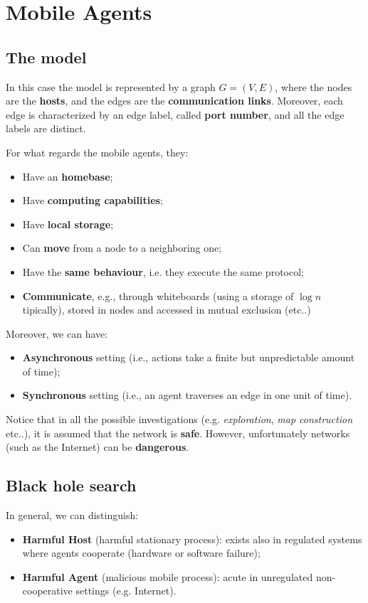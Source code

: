 \section{Mobile Agents}
\subsection{The model}
In this case the model is represented by a graph $G = (V,E)$, where the nodes are the \textbf{hosts}, and the edges are the \textbf{communication links}. Moreover, each edge is characterized by an edge label, called \textbf{port number}, and all the edge labels are distinct.

For what regards the mobile agents, they:
\begin{itemize}
    \item Have an \textbf{homebase};
    \item Have \textbf{computing capabilities};
    \item Have \textbf{local storage};
    \item Can \textbf{move} from a node to a neighboring one;
    \item Have the \textbf{same behaviour}, i.e. they execute the same protocol;
    \item \textbf{Communicate}, e.g., through whiteboards (using a storage of $\log n$ tipically), stored in nodes and accessed in mutual exclusion (etc..)
\end{itemize}


Moreover, we can have:
\begin{itemize}
    \item \textbf{Asynchronous} setting (i.e., actions take a finite but unpredictable amount of time);
    \item \textbf{Synchronous} setting (i.e., an agent traverses an edge in one unit of time).
\end{itemize}

Notice that in all the possible investigations (e.g. \textit{exploration}, \textit{map construction} etc..), it is assumed that the network is \textbf{safe}. However, unfortunately networks (such as the Internet) can be \textbf{dangerous}.

\subsection{Black hole search}
In general, we can distinguish:
\begin{itemize}
    \item \textbf{Harmful Host} (harmful stationary process): exists also in regulated systems where agents cooperate (hardware or software failure);
    \item \textbf{Harmful Agent} (malicious mobile process): acute in unregulated non-cooperative settings (e.g. Internet).
\end{itemize}

